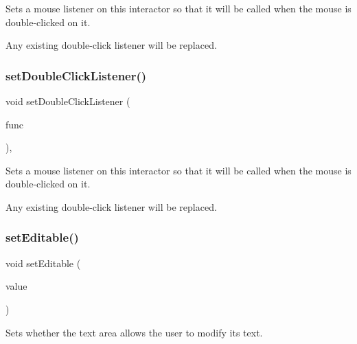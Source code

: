 Sets a mouse listener on this interactor so that it will be called when the mouse is double-\/clicked on it. 

Any existing double-\/click listener will be replaced. \mbox{\label{classsgl_1_1GInteractor_a50096194d66f48c92dd4c512d41bfc76}} 
\subsubsection{\texorpdfstring{set\+Double\+Click\+Listener()}{setDoubleClickListener()}\hspace{0.1cm}{\footnotesize\ttfamily [2/2]}}
{\footnotesize\ttfamily void set\+Double\+Click\+Listener (\begin{DoxyParamCaption}\item[{\mbox{\hyperlink{namespacesgl_a54427ce97bb1c2804e4fe2b0a62e8b17}{G\+Event\+Listener\+Void}}}]{func }\end{DoxyParamCaption})\hspace{0.3cm}{\ttfamily [virtual]}, {\ttfamily [inherited]}}



Sets a mouse listener on this interactor so that it will be called when the mouse is double-\/clicked on it. 

Any existing double-\/click listener will be replaced. \mbox{\label{classsgl_1_1GTextArea_a008d7fd44fb3e7a6886cdaddbc3644a2}} 
\subsubsection{\texorpdfstring{set\+Editable()}{setEditable()}}
{\footnotesize\ttfamily void set\+Editable (\begin{DoxyParamCaption}\item[{bool}]{value }\end{DoxyParamCaption})\hspace{0.3cm}{\ttfamily [virtual]}}



Sets whether the text area allows the user to modify its text. 

